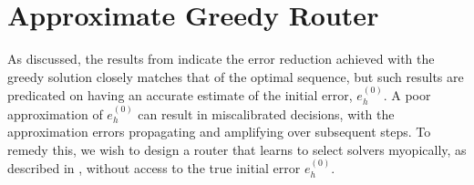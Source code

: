 \documentclass{article} %
\newtheorem{corollary}[theorem]{Corollary}
\begin{document}
    


\section{Approximate Greedy Router} \label{sec:approxgreedy}

As discussed, the results from  indicate the error reduction achieved with the greedy solution closely matches that of the optimal sequence, but such results are predicated on having an accurate estimate of the initial error, $e^{(0)}_h$. A poor approximation of $e^{(0)}_h$ can result in miscalibrated decisions, with the approximation errors propagating and amplifying over subsequent steps. To remedy this, we wish to design a router that learns to select solvers myopically, as described in , without access to the true initial error $e^{(0)}_h$. 
\end{document}

